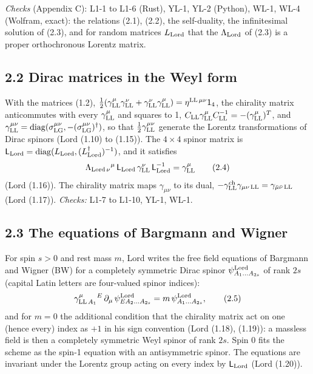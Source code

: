 \documentclass[
  10pt,
]{article}
\begin{document}
\emph{Checks} (Appendix C): L1-1 to L1-6 (Rust), YL-1, YL-2 (Python),
WL-1, WL-4 (Wolfram, exact): the relations (2.1), (2.2), the
self-duality, the infinitesimal solution of (2.3), and for random
matrices \(L_{\rm Lord}\) that the \(\Lambda_{\rm Lord}\) of (2.3) is a
proper orthochronous Lorentz matrix.

\hypertarget{dirac-matrices-in-the-weyl-form}{%
\subsection{2.2 Dirac matrices in the Weyl
form}\label{dirac-matrices-in-the-weyl-form}}

With the matrices (1.2),
\(\tfrac12(\gamma^\mu_{\rm LL}\gamma^\nu_{\rm LL}+\gamma^\nu_{\rm LL}\gamma^\mu_{\rm LL})=\eta^{{\rm LL}\,\mu\nu}\mathsf 1_4\),
the chirality matrix anticommutes with every \(\gamma^\mu_{\rm LL}\) and
squares to 1,
\(C_{\rm LL}\gamma^\mu_{\rm LL}C_{\rm LL}^{-1}=-(\gamma^\mu_{\rm LL})^T\),
and
\(\gamma^{\mu\nu}_{\rm LL}=\mathrm{diag}(\sigma^{\mu\nu}_{\rm LG},-(\sigma^{\mu\nu}_{\rm LG})^\dagger)\),
so that \(\tfrac12\gamma^{\mu\nu}_{\rm LL}\) generate the Lorentz
transformations of Dirac spinors (Lord (1.10) to (1.15)). The
\(4\times4\) spinor matrix is
\(\mathsf L_{\rm Lord}=\mathrm{diag}(L_{\rm Lord},(L_{\rm Lord}^\dagger)^{-1})\),
and it satisfies
\[\Lambda_{{\rm Lord}\,\nu}{}^\mu\,\mathsf L_{\rm Lord}\,\gamma^\nu_{\rm LL}\,\mathsf L_{\rm Lord}^{-1}=\gamma^\mu_{\rm LL}\tag{2.4}\]
(Lord (1.16)). The chirality matrix maps \(\gamma_{\mu\nu}\) to its
dual,
\(-\gamma^{\rm ch}_{\rm LL}\gamma_{\mu\nu\,{\rm LL}}=\gamma_{\bar\mu\bar\nu\,{\rm LL}}\)
(Lord (1.17)). \emph{Checks:} L1-7 to L1-10, YL-1, WL-1.

\hypertarget{the-equations-of-bargmann-and-wigner}{%
\subsection{2.3 The equations of Bargmann and
Wigner}\label{the-equations-of-bargmann-and-wigner}}

For spin \(s>0\) and rest mass \(m\), Lord writes the free field
equations of Bargmann and Wigner (BW) for a completely symmetric Dirac
spinor \(\psi^{\rm Lord}_{A_1\dots A_{2s}}\) of rank \(2s\) (capital
Latin letters are four-valued spinor indices):
\[\gamma^{\mu}_{{\rm LL}\,A_1}{}^{E}\,\partial_\mu\,\psi^{\rm Lord}_{EA_2\dots A_{2s}}=m\,\psi^{\rm Lord}_{A_1\dots A_{2s}},\tag{2.5}\]
and for \(m=0\) the additional condition that the chirality matrix act
on one (hence every) index as \(+1\) in his sign convention (Lord
(1.18), (1.19)): a massless field is then a completely symmetric Weyl
spinor of rank \(2s\). Spin 0 fits the scheme as the spin-1 equation
with an antisymmetric spinor. The equations are invariant under the
Lorentz group acting on every index by \(\mathsf L_{\rm Lord}\) (Lord
(1.20)).
\end{document}
